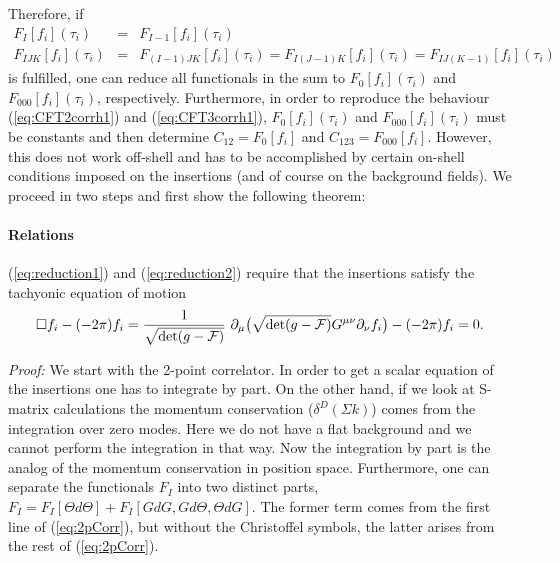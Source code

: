 \documentclass[a4paper,11pt]{article}               \def\new#1\endnew{{\bf #1}}
\newcommand {\cF} {{\cal F}}
\begin{document}
Therefore, if 
\begin{eqnarray}
  \label{eq:reduction1}
  F_I[f_i](\tau_i) &=& F_{I-1}[f_i](\tau_i) 
\\
  \label{eq:reduction2}
  F_{IJK}[f_i](\tau_i) &=& F_{(I-1)JK}[f_i](\tau_i) = 
  F_{I(J-1)K}[f_i](\tau_i) = F_{IJ(K-1)}[f_i](\tau_i)
\end{eqnarray}
is fulfilled, one can reduce all functionals in the sum to
$F_0[f_i](\tau_i)$ and $F_{000}[f_i](\tau_i)$, respectively.
Furthermore, in order to reproduce the behaviour (\ref{eq:CFT2corrh1})
and (\ref{eq:CFT3corrh1}), $F_0[f_i](\tau_i)$ and $F_{000}[f_i](\tau_i)$
must be constants and then determine $C_{12}=F_0[f_i]$ and
$C_{123}=F_{000}[f_i]$.
However, this does not work off-shell and has to be accomplished by
certain on-shell conditions imposed  on the insertions 
(and of course on the background fields). We proceed in two steps and 
first show the following theorem:
\paragraph{Relations}\hspace*{-0.3cm}
(\ref{eq:reduction1}) and (\ref{eq:reduction2}) require 
that the insertions satisfy the tachyonic equation of
motion
\begin{eqnarray}
  \label{eq:eomtachyon}
  \square f_i - (-2\pi) f_i = 
  \frac {1}{\sqrt{\det(g-\cF)}} ~\partial_\mu 
  \bigl(\sqrt{\det(g-\cF)}G^{\mu\nu}\partial_\nu f_i \bigr) - (-2\pi) f_i = 0.
\end{eqnarray}


\noindent
\emph{Proof:} We start with the 2-point correlator. In order to get a
scalar equation of the insertions one has to integrate by part. 
On the other hand, if we look at S-matrix calculations 
\cite{Polchinski:1998rq} the momentum 
conservation ($\delta^D(\Sigma k)$) comes from the integration over
zero modes. Here we do not have a flat background and we cannot perform
the integration in that way. Now the integration by part is the analog of
the momentum conservation in position space. Furthermore, one can
separate the functionals $F_I$ into two distinct parts,
$F_I = F_I[\Theta d\Theta] + F_I[GdG,Gd\Theta,\Theta dG]$. The former
term comes from the first line of (\ref{eq:2pCorr}), but without the
Christoffel symbols, the latter arises from the rest of (\ref{eq:2pCorr}).
\end{document}
